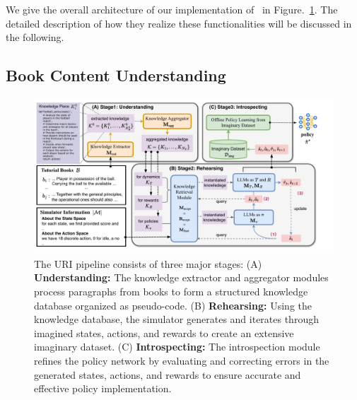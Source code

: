 We give the overall architecture of our implementation of \algo~in Figure.~\ref{fig:3-stage-implmentation}. The detailed description of how they realize these functionalities will be discussed in the following. 

\vspace{-1mm}
\subsection{Book Content Understanding}
\label{sec:book_content_understanding}
\vspace{-2mm}


\begin{figure}[t]
    \vspace{-12mm}
    \includegraphics[width=1.06\linewidth]{fig/phrase-1.pdf}
    \vspace{-7mm}
    \caption{The URI pipeline consists of three major stages: (A) \textbf{Understanding:} The knowledge extractor and aggregator modules process paragraphs from books to form a structured knowledge database organized as pseudo-code. (B) \textbf{Rehearsing:} Using the knowledge database, the simulator generates and iterates through imagined states, actions, and rewards to create an extensive imaginary dataset. (C) \textbf{Introspecting:} The introspection module refines the policy network by evaluating and correcting errors in the generated states, actions, and rewards to ensure accurate and effective policy implementation.}
    \label{fig:3-stage-implmentation}
\vspace{-7mm}
\end{figure}


